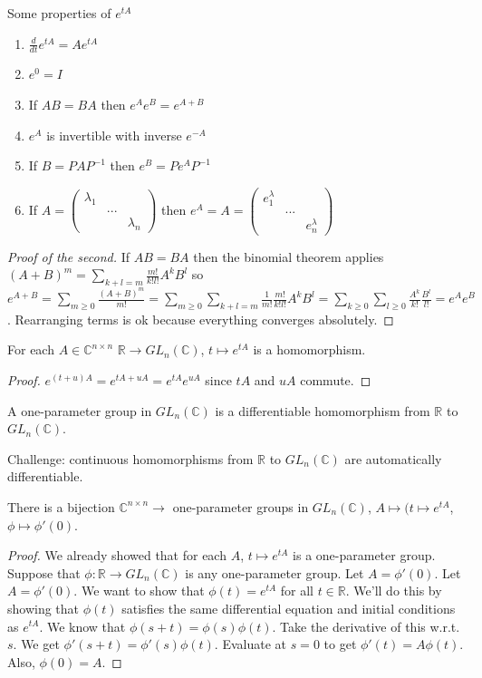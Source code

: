 \documentclass{article}
\newcommand{\C}{\mathbb{C}}
\newcommand{\R}{\mathbb{R}}
\newcommand{\ra}[1][]{\xrightarrow{#1}}
\begin{document}
Some properties of $e^{tA}$
\begin{enumerate}
    \item $\frac{d}{dt}e^{tA}=Ae^{tA}$
    \item $e^0=I$
    \item If $AB=BA$ then $e^Ae^B=e^{A+B}$
    \item $e^A$ is invertible with inverse $e^{-A}$
    \item If $B=PAP^{-1}$ then $e^B=Pe^AP^{-1}$
    \item If $A=\begin{pmatrix}
    \lambda_1&&\\&...&\\&&\lambda_n
    \end{pmatrix}$ then $e^A=A=\begin{pmatrix}
    e^\lambda_1&&\\&...&\\&&e^\lambda_n
    \end{pmatrix}$
\end{enumerate}
\begin{proof}[Proof of the second]
If $AB=BA$ then the binomial theorem applies $(A+B)^m=\sum_{k+l=m}\frac{m!}{k!l!}A^kB^l$ so $e^{A+B}=\sum_{m\geq 0}\frac{(A+B)^m}{m!}=\sum_{m\geq 0}\sum_{k+l=m}\frac{1}{m!}\frac{m!}{k!l!}A^kB^l=\sum_{k\geq 0}\sum_{l\geq 0}\frac{A^k}{k!}\frac{B^l}{l!}=e^Ae^B$. Rearranging terms is ok because everything converges absolutely.
\end{proof}
\begin{corollary}
For each $A\in\C^{n\times n}$ $\R\ra GL_n(\C)$, $t\mapsto e^{tA}$ is a homomorphism. 
\end{corollary}
\begin{proof}
$e^{(t+u)A}=e^{tA+uA}=e^{tA}e^{uA}$ since $tA$ and $uA$ commute.
\end{proof}
\begin{definition}
A one-parameter group in $GL_n(\C)$ is a differentiable homomorphism from $\R$ to $GL_n(\C)$. 
\end{definition}
Challenge: continuous homomorphisms from $\R$ to $GL_n(\C)$ are automatically differentiable. 
\begin{proposition}
There is a bijection $\C^{n\times n}\ra $ one-parameter groups in $GL_n(\C)$, $A\mapsto (t\mapsto e^{tA}$, $\phi\mapsto \phi'(0)$. 
\end{proposition}
\begin{proof}
We already showed that for each $A$, $t\mapsto e^{tA}$ is a one-parameter group. Suppose that $\phi:\R\ra GL_n(\C)$ is any one-parameter group. Let $A=\phi'(0)$. Let $A=\phi'(0)$. We want to show that $\phi(t)=e^{tA}$ for all $t\in \R$. We'll do this by showing that $\phi(t)$ satisfies the same differential equation and initial conditions as $e^{tA}$. We know that $\phi(s+t)=\phi(s)\phi(t)$. Take the derivative of this w.r.t. $s$. We get $\phi'(s+t)=\phi'(s)\phi(t)$. Evaluate at $s=0$ to get $\phi'(t)=A\phi(t)$. Also, $\phi(0)=A$.
\end{proof}
\end{document}
